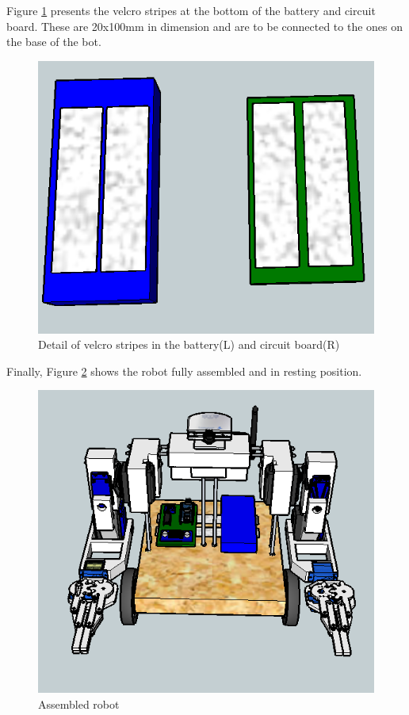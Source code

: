Figure \ref{ass29} presents the velcro stripes at the bottom of the battery and circuit board. These are 20x100mm in dimension and are to be connected to the ones on the base of the bot.\\

	\begin{figure}[H]
			\centering
			\includegraphics[scale=0.3]{images/Assembly/29.png}
			\caption{Detail of velcro stripes in the battery(L) and circuit board(R) }
			\label{ass29}
	\end{figure}
	\bigskip

\newpage
Finally, Figure \ref{ass30} shows the robot fully assembled and in resting position.\\

	\begin{figure}[H]
			\centering
			\includegraphics[scale=0.5]{images/Assembly/30.png}
			\caption{Assembled robot }
			\label{ass30}
	\end{figure}
	\bigskip


